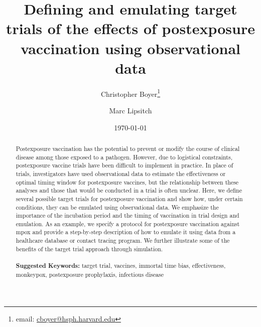 \documentclass[11pt]{article}
\begin{document}
\begin{titlepage}
\title{Defining and emulating target trials of the effects of postexposure vaccination using observational data}
\author[1]{Christopher Boyer\thanks{email: \href{mailto:cboyer@hsph.harvard.edu}{cboyer@hsph.harvard.edu}}}
\author[1,2]{Marc Lipsitch}
\date{\today}
\maketitle

\begin{abstract}
Postexposure vaccination has the potential to prevent or modify the course of clinical disease among those exposed to a pathogen. However, due to logistical constraints, postexposure vaccine trials have been difficult to implement in practice. In place of trials, investigators have used observational data to estimate the effectiveness or optimal timing window for postexposure vaccines, but the relationship between these analyses and those that would be conducted in a trial is often unclear. Here, we define several possible target trials for postexposure vaccination and show how, under certain conditions, they can be emulated using observational data. We emphasize the importance of the incubation period and the timing of vaccination in trial design and emulation. As an example, we specify a protocol for postexposure vaccination against mpox and provide a step-by-step description of how to emulate it using data from a healthcare database or contact tracing program. We further illustrate some of the benefits of the target trial approach through simulation.
\noindent \\
\vspace{0in} \\
\noindent\textbf{Suggested Keywords:} target trial, vaccines, immortal time bias, effectiveness, monkeypox, postexposure prophylaxis, infectious disease \\
\end{abstract}
\setcounter{page}{0}
\thispagestyle{empty}
\end{titlepage}
\pagebreak \newpage
\doublespacing
\end{document}
